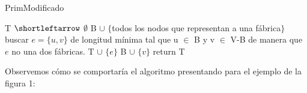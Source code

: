 \begin{algorithm}
\caption{PrimModificado}\label{ej1}
\begin{algorithmic}[1]
	\State T  $\shortleftarrow$ $\emptyset$
	\State B $\cup$ $\{$todos los nodos que representan a una fábrica$\}$
		\State buscar $e=\{u,v\}$ de longitud mínima tal que u $\in$ B y v $\in$ V-B de manera que $e$ no una dos fábricas.
		\State T $\cup$ $\{e\}$
		\State B $\cup$ $\{v\}$
	\EndWhile
	\State return T
\EndProcedure
\end{algorithmic}
\end{algorithm}

Observemos cómo se comportaría el algoritmo presentando para el ejemplo de la figura 1:

